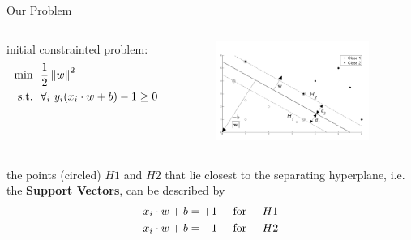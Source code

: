 \begin{frame}[fragile]{Our Problem}
  \begin{columns}[onlytextwidth, T, c]
    \begin{column}{.5\textwidth}
      initial constrainted problem:
      \newline
      \begin{equation*}
        \begin{split}
          \text{min}\ &\ \frac{1}{2} \left\lVert w\right\rVert^2 \\
          \text{s.t.}\ &\ \forall_{i}\ y_i (x_i \cdot w + b) -1 \geq 0
        \end{split}
      \end{equation*}
    \end{column}
    \begin{column}{.5\textwidth}
        \begin{figure}
          \centering    
          \includegraphics[width=5cm]{assets/images/s1.01.png}
        \end{figure}
    \end{column}    
  \end{columns}
  
  \vspace{.7cm}
  
  the points (circled) $H1$ and $H2$ that lie closest to the separating hyperplane, 
  i.e. the \textbf{Support Vectors}, can be described by
  \begin{equation*}
    \begin{split}
      x_i \cdot w + b = +1 & \hspace{.5cm} \text{for} \hspace{.5cm} H1 \\
      x_i \cdot w + b = -1 & \hspace{.5cm} \text{for} \hspace{.5cm} H2
    \end{split}
  \end{equation*}

\end{frame}


